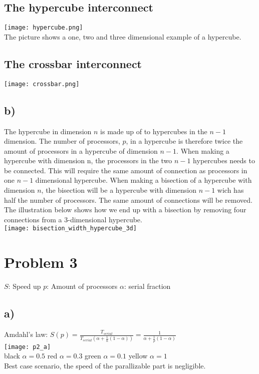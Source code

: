 \documentclass[a4paper, 11pt, english]{article}
\begin{document}
\subsection*{The hypercube interconnect}
	\texttt{[image: hypercube.png]}
	\\The picture shows a one, two and three dimensional example of a hypercube.
\subsection{The crossbar interconnect}
	\texttt{[image: crossbar.png]}
\subsection*{b)}
The hypercube in dimension $n$ is made up of to hypercubes in the \begin{math}n-1\end{math} dimension. The number of processors, \begin{math}p\end{math}, in a hypercube is therefore twice the amount of processors in a hypercube of dimension \begin{math}n-1\end{math}. When making a hypercube with dimension n, the processors in the two \begin{math}n-1\end{math} hypercubes needs to be connected. This will require the same amount of connection as processors in one \begin{math}n-1\end{math} dimensional hypercube. When making a bisection of a hypercube with dimension \begin{math}n\end{math}, the bisection will be a hypercube with dimension \begin{math}n-1\end{math} wich has half the number of processors. The same amount of connections will be removed. The illustration below shows how we end up with a bisection by removing four connections from a 3-dimensional hypercube.\\
\texttt{[image: bisection\_width\_hypercube\_3d]}
\section*{Problem 3}
$S$: Speed up
$p$: Amount of processors
$\alpha$: serial fraction
\subsection*{a)}
Amdahl's law:
\begin{math}
S(p) = \frac{T_{serial}} {T_{serial}(\alpha + \frac{1}{n}(1-\alpha))}
=	\frac{1}{\alpha + \frac{1}{p}(1-\alpha)}
\end{math}\\
\texttt{[image: p2\_a]}
\\black $\alpha = 0.5$ red $\alpha=0.3$ green $\alpha=0.1$ yellow $\alpha=1$
\\Best case scenario, the speed of the parallizable part is negligible.
\end{document}

